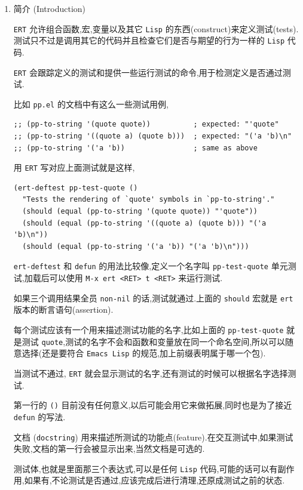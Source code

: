 \documentclass[11pt]{article}
\begin{document}
\begin{enumerate}
\item 简介 (Introduction)
\label{sec:org7db49bb}

\texttt{ERT} 允许组合函数,宏,变量以及其它 \texttt{Lisp} 的东西(construct)来定义测试(tests).测试只不过是调用其它的代码并且检查它们是否与期望的行为一样的 \texttt{Lisp} 代码.

\texttt{ERT} 会跟踪定义的测试和提供一些运行测试的命令,用于检测定义是否通过测试.

比如 \texttt{pp.el} 的文档中有这么一些测试用例,

\begin{verbatim}
;; (pp-to-string '(quote quote))          ; expected: "'quote"
;; (pp-to-string '((quote a) (quote b)))  ; expected: "('a 'b)\n"
;; (pp-to-string '('a 'b))                ; same as above
\end{verbatim}

用 \texttt{ERT} 写对应上面测试就是这样,

\begin{verbatim}
(ert-deftest pp-test-quote ()
  "Tests the rendering of `quote' symbols in `pp-to-string'."
  (should (equal (pp-to-string '(quote quote)) "'quote"))
  (should (equal (pp-to-string '((quote a) (quote b))) "('a 'b)\n"))
  (should (equal (pp-to-string '('a 'b)) "('a 'b)\n")))
\end{verbatim}

\texttt{ert-deftest} 和 \texttt{defun} 的用法比较像,定义一个名字叫 \texttt{pp-test-quote} 单元测试,加载后可以使用 \texttt{M-x ert <RET> t <RET>} 来运行测试.

如果三个调用结果全员 \texttt{non-nil} 的话,测试就通过.上面的 \texttt{should} 宏就是 \texttt{ert} 版本的断言语句(assertion).

每个测试应该有一个用来描述测试功能的名字,比如上面的 \texttt{pp-test-quote} 就是测试 \texttt{quote},测试的名字不会和函数和变量放在同一个命名空间,所以可以随意选择(还是要符合 \texttt{Emacs Lisp} 的规范,加上前缀表明属于哪一个包).

当测试不通过, \texttt{ERT} 就会显示测试的名字,还有测试的时候可以根据名字选择测试.

第一行的 \texttt{()} 目前没有任何意义,以后可能会用它来做拓展,同时也是为了接近 \texttt{defun} 的写法.

文档 (\texttt{docstring}) 用来描述所测试的功能点(feature).在交互测试中,如果测试失败,文档的第一行会被显示出来,当然文档是可选的.

测试体,也就是里面那三个表达式,可以是任何 \texttt{Lisp} 代码,可能的话可以有副作用,如果有,不论测试是否通过,应该完成后进行清理,还原成测试之前的状态.



\end{enumerate}
\end{document}
